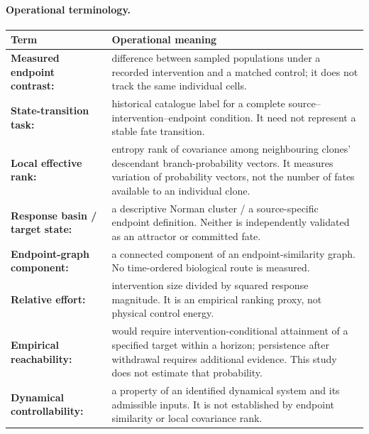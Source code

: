 \documentclass[a4paper,fleqn]{cas-sc}
\makeatletter
\DeclareRobustCommand{\rev}[1]{{\color{red}\def\@citecolor{black}\def\@linkcolor{red}\def\@urlcolor{red}#1}}
\makeatother
\begin{document}
\paragraph{Operational terminology.}
\begin{longtable}{p{}p{}}
\toprule
\rev{Term} & \rev{Operational meaning}\\ 
\midrule
\endhead
\rev{\textbf{Measured endpoint contrast:}} & \rev{difference between sampled populations under a recorded intervention and a matched control; it does not track the same individual cells.}\\
\rev{\textbf{State-transition task:}} & \rev{historical catalogue label for a complete source--intervention--endpoint condition. It need not represent a stable fate transition.}\\
\rev{\textbf{Local effective rank:}} & \rev{entropy rank of covariance among neighbouring clones' descendant branch-probability vectors. It measures variation of probability vectors, not the number of fates available to an individual clone.}\\
\rev{\textbf{Response basin / target state:}} & \rev{a descriptive Norman cluster / a source-specific endpoint definition. Neither is independently validated as an attractor or committed fate.}\\
\rev{\textbf{Endpoint-graph component:}} & \rev{a connected component of an endpoint-similarity graph. No time-ordered biological route is measured.}\\
\rev{\textbf{Relative effort:}} & \rev{intervention size divided by squared response magnitude. It is an empirical ranking proxy, not physical control energy.}\\
\rev{\textbf{Empirical reachability:}} & \rev{would require intervention-conditional attainment of a specified target within a horizon; persistence after withdrawal requires additional evidence. This study does not estimate that probability.}\\
\rev{\textbf{Dynamical controllability:}} & \rev{a property of an identified dynamical system and its admissible inputs. It is not established by endpoint similarity or local covariance rank.}\\
\bottomrule
\end{longtable}
\end{document}
